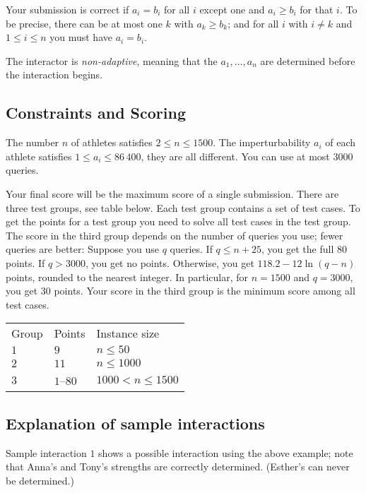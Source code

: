 Your submission is correct if $a_i=b_i$ for all $i$ except one and $a_i \ge b_i$ for that $i$.
To be precise, there can be at most one $k$ with $a_k\geq b_k$;
and for all $i$ with $i\neq k$ and $1\leq i\leq n$ you must have $a_i=b_i$.

The interactor is \emph{non-adaptive}, meaning that the $a_1,\ldots, a_n$ are determined before the interaction begins.

\subsection*{Constraints and Scoring}

The number $n$ of athletes satisfies 
$2\leq n\leq 1500$. %
The imperturbability $a_i$ of each athlete satisfies 
$1\leq a_i\leq 86\,400$, %
they are all different. %
You can use 
at most $3000$ queries. %

Your final score will be the maximum score of a single submission.
There are three test groups, see table below.
Each test group contains a set of test cases. 
To get the points for a test group you need to solve all test cases in the test group.
The score in the third group depends on the number of queries you use;
fewer queries are better: Suppose you use $q$ queries. If $q \le n+25$, you get the full 80 points. If $q > 3000$, you get no points.
Otherwise, you get $118.2 - 12 \ln(q - n)$ points, rounded to the nearest integer. In particular, for $n = 1500$ and $q = 3000$, you get $30$ points.
Your score in the third group is the minimum score among all test cases.

\medskip
\begin{tabular}{lll}
Group & Points & Instance size\\
$1$  &  $9$ & $n\leq 50$\\
$2$  &  $11$ & $n\leq 1000$\\
$3$  &  $1$--$80$ & $1000 < n\leq 1500$\\
\end{tabular}

\subsection*{Explanation of sample interactions}


Sample interaction $1$ shows a possible interaction using the above example; note that Anna's and Tony's strengths are correctly determined.
(Esther's can never be determined.)
